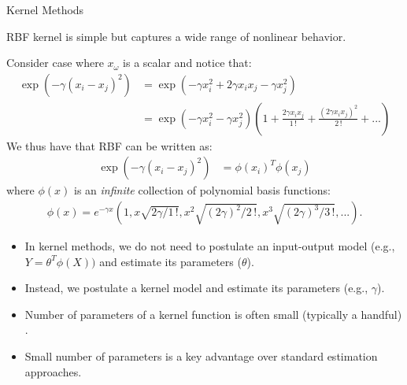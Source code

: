 \documentclass[handout,9pt]{beamer}
\begin{document}
\begin{frame}{Kernel Methods}

RBF kernel is simple but captures a wide range of nonlinear behavior. 
\begin{block}{}
Consider case where $x_\omega$ is a scalar and notice that:
\begin{align*}
\exp(-\gamma(x_i-x_j)^2)&=\exp(-\gamma x_i^2+2\gamma x_ix_j-\gamma x_j^2)\\
&=\exp(-\gamma x_i^2-\gamma x_j^2)\left(1+\frac{2\gamma x_ix_j}{1\, !}+\frac{(2\gamma x_ix_j)^2}{2\,!}+...\right)
\end{align*}
We thus have that RBF can be written as:
\begin{align*}
\exp(-\gamma(x_i-x_j)^2)&=\phi(x_i)^T\phi(x_j)
\end{align*}
where $\phi(x)$ is an {\em infinite} collection of polynomial basis functions: 
\begin{align*}
\phi(x)=e^{-\gamma x}(1,x\sqrt{2\gamma/1\,!},x^2\sqrt{(2\gamma)^2/2\,!},x^3\sqrt{(2\gamma)^3/3\,!},...). 
\end{align*}
\end{block}
\begin{itemize}
\item In kernel methods, we do not need to postulate an input-output model (e.g., $Y=\theta^T\phi(X))$ and estimate its parameters ($\theta$).  
\item Instead, we postulate a kernel model and estimate its parameters (e.g., $\gamma$).  
\item Number of parameters of a kernel function is often small (typically a handful) . 
\item Small number of parameters is a key advantage over standard estimation approaches. 
\end{itemize}


\end{frame}
\end{document}
